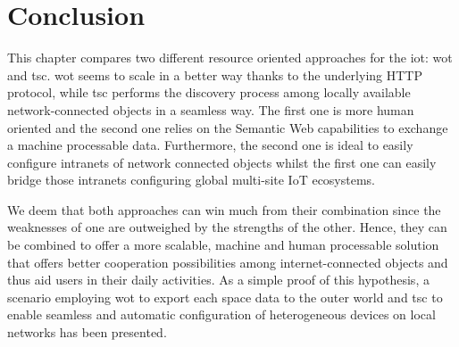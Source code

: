 \section{Conclusion}
\label{sec:tsc_wot_conclusion}



This chapter compares two different resource oriented approaches for the \acl{iot}: \acl{wot} and \acl{tsc}.
\ac{wot} seems to scale in a better way thanks to the underlying HTTP protocol, while \ac{tsc} performs the discovery process among locally available network-connected objects in a seamless way.
The first one is more human oriented and the second one relies on the Semantic Web capabilities to exchange a machine processable data.
Furthermore, the second one is ideal to easily configure intranets of network connected objects whilst the first one can easily bridge those intranets configuring global multi-site IoT ecosystems.

We deem that both approaches can win much from their combination since the weaknesses of one are outweighed by the strengths of the other.
Hence, they can be combined to offer a more scalable, machine and human processable solution that offers better cooperation possibilities among internet-connected objects and thus aid users in their daily activities.
As a simple proof of this hypothesis, a scenario employing \ac{wot} to export each space data to the outer world and \ac{tsc} to enable seamless and automatic configuration of heterogeneous devices on local networks has been presented.